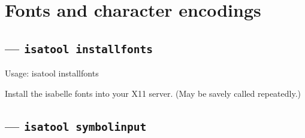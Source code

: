 
\chapter{Fonts and character encodings}

\section{ --- \texttt{isatool installfonts}}

\begin{ttbox}
Usage: isatool installfonts

  Install the isabelle fonts into your X11 server.
  (May be savely called repeatedly.)
\end{ttbox}


\section{ --- \texttt{isatool symbolinput}}


%
